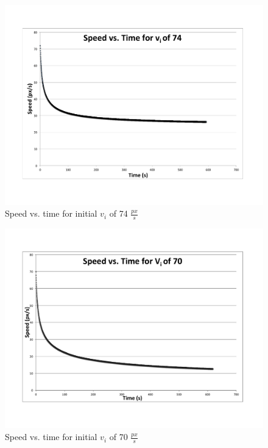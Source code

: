 \begin{figure}[h] 
	\centering
		\includegraphics[width=12cm]{Figures/fig2.pdf}

	\caption{Speed vs. time for initial $v_i$ of 74 $\frac{px}{s}$}
	\label{fig:data2}
\end{figure}


\begin{figure}[h] 
	\centering
		\includegraphics[width=12cm]{Figures/fig3.pdf}

	\caption{Speed vs. time for initial $v_i$ of 70 $\frac{px}{s}$}
	\label{fig:data3}
\end{figure}




